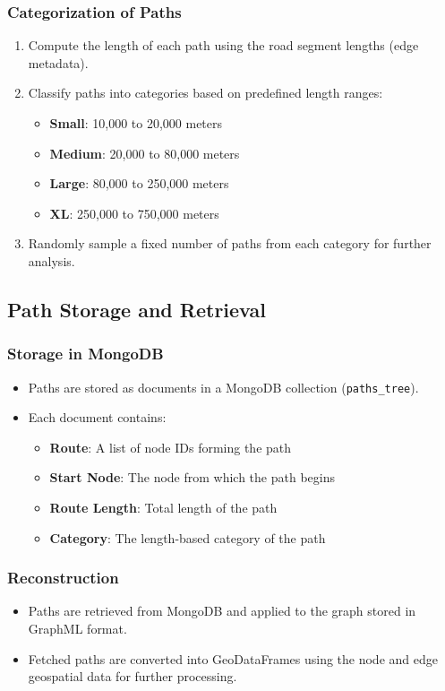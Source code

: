 \documentclass[sigplan,screen]{acmart}
\begin{document}
\subsubsection{Categorization of Paths}
\begin{enumerate}
    \item Compute the length of each path using the road segment lengths (edge metadata).
    \item Classify paths into categories based on predefined length ranges:
    \begin{itemize}
        \item \textbf{Small}: 10,000 to 20,000 meters
        \item \textbf{Medium}: 20,000 to 80,000 meters
        \item \textbf{Large}: 80,000 to 250,000 meters
        \item \textbf{XL}: 250,000 to 750,000 meters
    \end{itemize}
    \item Randomly sample a fixed number of paths from each category for further analysis.
\end{enumerate}

\subsection{Path Storage and Retrieval}
\subsubsection{Storage in MongoDB}
\begin{itemize}
    \item Paths are stored as documents in a MongoDB collection (\texttt{paths\_tree}).
    \item Each document contains:
    \begin{itemize}
        \item \textbf{Route}: A list of node IDs forming the path
        \item \textbf{Start Node}: The node from which the path begins
        \item \textbf{Route Length}: Total length of the path
        \item \textbf{Category}: The length-based category of the path
    \end{itemize}
\end{itemize}

\subsubsection{Reconstruction}
\begin{itemize}
    \item Paths are retrieved from MongoDB and applied to the graph stored in GraphML format.
    \item Fetched paths are converted into GeoDataFrames using the node and edge geospatial data for further processing.
\end{itemize}
\end{document}
